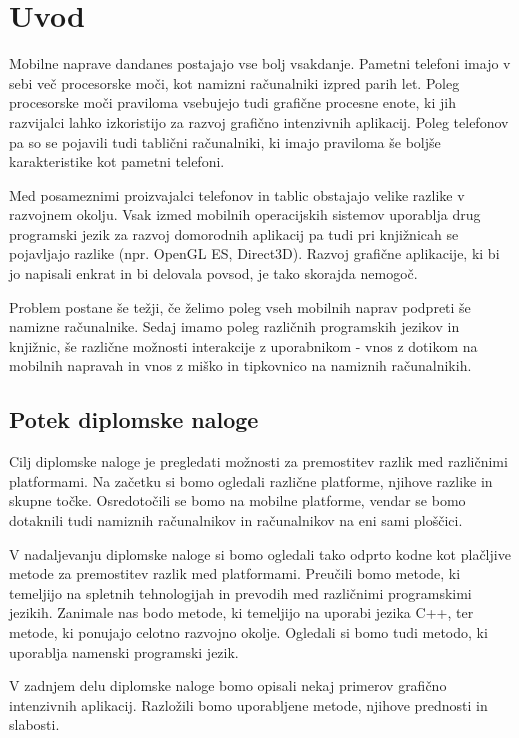\chapter{Uvod}

Mobilne naprave dandanes postajajo vse bolj vsakdanje. Pametni telefoni imajo v sebi več procesorske moči, kot namizni računalniki izpred parih let. Poleg procesorske moči praviloma vsebujejo tudi grafične procesne enote, ki jih razvijalci lahko izkoristijo za razvoj grafično intenzivnih aplikacij. Poleg telefonov pa so se pojavili tudi tablični računalniki, ki imajo praviloma še boljše karakteristike kot pametni telefoni. 

Med posameznimi proizvajalci telefonov in tablic obstajajo velike razlike v razvojnem okolju. Vsak izmed mobilnih operacijskih sistemov uporablja drug programski jezik za razvoj domorodnih aplikacij pa tudi pri knjižnicah se pojavljajo razlike (npr. OpenGL ES, Direct3D). Razvoj grafične aplikacije, ki bi jo napisali enkrat in bi delovala povsod, je tako skorajda nemogoč.

Problem postane še težji, če želimo poleg vseh mobilnih naprav podpreti še namizne računalnike. Sedaj imamo poleg različnih programskih jezikov in knjižnic, še različne možnosti interakcije z uporabnikom - vnos z dotikom na mobilnih napravah in vnos z miško in tipkovnico na namiznih računalnikih.

\section{Potek diplomske naloge}

Cilj diplomske naloge je pregledati možnosti za premostitev razlik med različnimi platformami. Na začetku si bomo ogledali različne platforme, njihove razlike in skupne točke. Osredotočili se bomo na mobilne platforme, vendar se bomo dotaknili tudi namiznih računalnikov in računalnikov na eni sami ploščici.

V nadaljevanju diplomske naloge si bomo ogledali tako odprto kodne kot plačljive metode za premostitev razlik med platformami. Preučili bomo metode, ki temeljijo na spletnih tehnologijah in prevodih med različnimi programskimi jezikih. Zanimale nas bodo metode, ki temeljijo na uporabi jezika C++, ter metode, ki ponujajo celotno razvojno okolje. Ogledali si bomo tudi metodo, ki uporablja namenski programski jezik.

V zadnjem delu diplomske naloge bomo opisali nekaj primerov grafično intenzivnih aplikacij. Razložili bomo uporabljene metode, njihove prednosti in slabosti.


